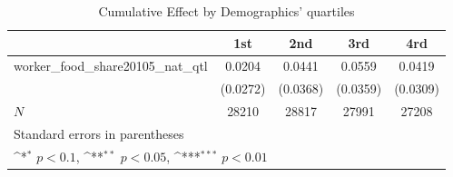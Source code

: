 \begin{table}[htbp]\centering
\def\sym#1{\ifmmode^{#1}\else\(^{#1}\)\fi}
\caption{Cumulative Effect by Demographics' quartiles}
\begin{tabular}{l*{4}{c}}
\hline\hline
            &\multicolumn{1}{c}{1st}&\multicolumn{1}{c}{2nd}&\multicolumn{1}{c}{3rd}&\multicolumn{1}{c}{4rd}\\
\hline
worker\_food\_share20105\_nat\_qtl&      0.0204         &      0.0441         &      0.0559         &      0.0419         \\
            &    (0.0272)         &    (0.0368)         &    (0.0359)         &    (0.0309)         \\
\hline
\(N\)       &       28210         &       28817         &       27991         &       27208         \\
\hline\hline
\multicolumn{5}{l}{\footnotesize Standard errors in parentheses}\\
\multicolumn{5}{l}{\footnotesize \sym{*} \(p<0.1\), \sym{**} \(p<0.05\), \sym{***} \(p<0.01\)}\\
\end{tabular}
\end{table}
